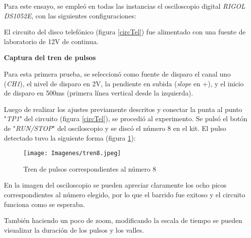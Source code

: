 Para este ensayo, se empleó en todas las instancias el osciloscopio digital \textit{RIGOL DS1052E}, con las siguientes configuraciones:

\begin{table}[H]
    \centering
        \def\tablename{Tabla} 
        \caption{Cuadro de Controles}
        \label{tab:cont11}
\end{table}

El circuito del disco telefónico (figura \ref{circTel}) fue alimentado con una fuente de laboratorio de 12V de continua.



\vspace{10mm}
\textbf{Captura del tren de pulsos}

\vspace{3mm}
Para esta primera prueba, se seleccionó como fuente de disparo el canal uno (\textit{CH1}), el nivel de disparo en 2V, la pendiente en subida (\textit{slope} en +), y el inicio de disparo en 500ms (primera línea vertical desde la izquierda).

Luego de realizar los ajustes previamente descritos y conectar la punta al punto "\textit{TP1}" del circuito (figura \ref{circTel}), se procedió al experimento. Se pulsó el botón de "\textit{RUN/STOP}" del osciloscopio y se discó el número $8$ en el kit. El pulso detectado tuvo la siguiente forma (figura \ref{fig:disc8}):

\begin{figure}[H]
    \centering
        \texttt{[image: Imagenes/tren8.jpeg]}
    \caption{Tren de pulsos correspondientes al número $8$}
    \label{fig:disc8}
\end{figure}

En la imagen del osciloscopio se pueden apreciar claramente los ocho picos correspondientes al número elegido, por lo que el barrido fue exitoso y el circuito funciona como se esperaba.

También haciendo un poco de zoom, modificando la escala de tiempo se pueden visualizar la duración de los pulsos y los valles. 


